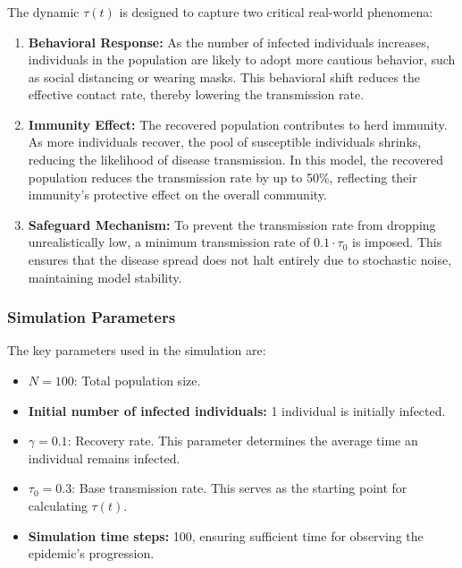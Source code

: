 \documentclass[12pt,a4paper]{article}
\begin{document}
\subsubsection*{}
The dynamic \(\tau(t)\) is designed to capture two critical real-world phenomena:
\begin{enumerate}
    \item \textbf{Behavioral Response:} 
    As the number of infected individuals increases, individuals in the population are likely to adopt more cautious behavior, such as social distancing or wearing masks. This behavioral shift reduces the effective contact rate, thereby lowering the transmission rate.
    
    \item \textbf{Immunity Effect:} 
    The recovered population contributes to herd immunity. As more individuals recover, the pool of susceptible individuals shrinks, reducing the likelihood of disease transmission. In this model, the recovered population reduces the transmission rate by up to 50\%, reflecting their immunity's protective effect on the overall community.
    
    \item \textbf{Safeguard Mechanism:} 
    To prevent the transmission rate from dropping unrealistically low, a minimum transmission rate of \(0.1 \cdot \tau_0\) is imposed. This ensures that the disease spread does not halt entirely due to stochastic noise, maintaining model stability.
\end{enumerate}


\subsubsection*{Simulation Parameters}
The key parameters used in the simulation are:
\begin{itemize}
    \item \(N = 100\): Total population size.
    \item \textbf{Initial number of infected individuals:} 1 individual is initially infected.
    \item \(\gamma = 0.1\): Recovery rate. This parameter determines the average time an individual remains infected.
    \item \(\tau_0 = 0.3\): Base transmission rate. This serves as the starting point for calculating \(\tau(t)\).
    \item \textbf{Simulation time steps:} 100, ensuring sufficient time for observing the epidemic's progression.
\end{itemize}
\end{document}
